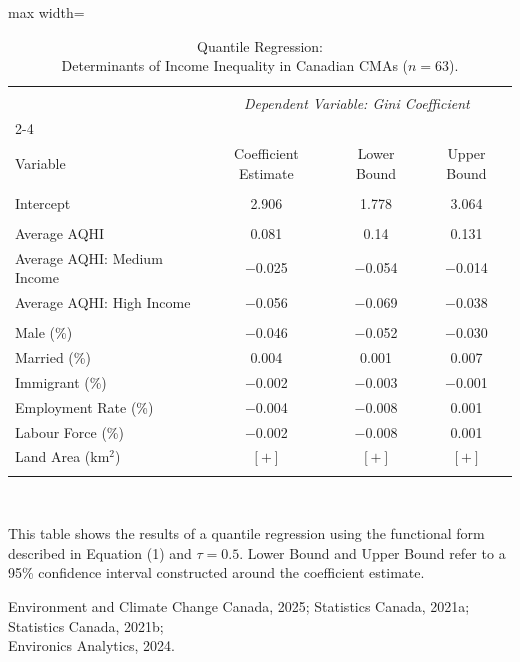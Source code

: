 \documentclass[AEJ]{AEA}
\begin{document}
\begin{table}[!htbp] \centering 
  \caption{Quantile Regression:\\Determinants of Income 
  Inequality in Canadian CMAs ($n = 63$).} 
  \label{tab:quantreg} 
\begin{adjustbox}{max width=\textwidth}
\begin{tabular}{@{\extracolsep{5pt}}lccc} 
\\[-1.8ex]\hline 
\hline \\[-1.8ex] 
 & \multicolumn{3}{c}{\textit{Dependent Variable: Gini Coefficient}} \\ 
\cline{2-4} 
\\[-1.8ex] Variable & Coefficient Estimate & Lower Bound & Upper Bound \\ 
\hline \\[-1.8ex] 
Intercept & 2.906 & 1.778 & 3.064 \\
\\
Average AQHI & 0.081 & 0.14 & 0.131\\
Average AQHI: Medium Income & $-$0.025 & $-$0.054 & $-$0.014 \\ 
Average AQHI: High Income & $-$0.056 & $-$0.069 & $-$0.038 \\
\\
Male (\%) & $-$0.046 & $-$0.052 & $-$0.030 \\ 
Married (\%) & 0.004 & 0.001 & 0.007 \\ 
Immigrant (\%) & $-$0.002 & $-$0.003 & $-$0.001 \\ 
Employment Rate (\%) & $-$0.004 & $-$0.008 & 0.001 \\ 
Labour Force (\%) & $-$0.002 & $-$0.008 & 0.001 \\ 
Land Area (km$^2$) & $[+]$ & $[+]$ & $[+]$ \\ 
\hline 
\hline \\[-1.8ex] 
\end{tabular} 
\end{adjustbox}
\\[1ex]
\begin{tablenotes}
This table shows the results of a quantile regression using the functional form
described in Equation (1) and $\tau = 0.5$.
Lower Bound and Upper Bound refer to a 95\% confidence interval constructed
around the coefficient estimate.
\\
\end{tablenotes}
\begin{tablenotes}[Source]
Environment and Climate Change Canada, 2025; Statistics Canada, 2021a;
Statistics Canada, 2021b; \\Environics Analytics, 2024.
\end{tablenotes}
\end{table} 
\end{document}
